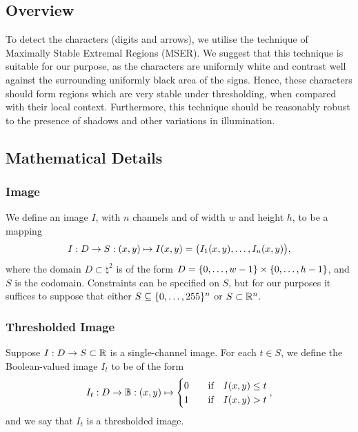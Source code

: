 \documentclass{article}
\begin{document}
\subsection{Overview}
\label{sec:implementation-overview}

To detect the characters (digits and arrows), we utilise the technique of
Maximally Stable Extremal Regions (MSER).
We suggest that this technique is suitable for our purpose, as the characters
are uniformly white and contrast well against the surrounding uniformly black
area of the signs.
Hence, these characters should form regions which are very stable under
thresholding, when compared with their local context.
Furthermore, this technique should be reasonably robust to the presence of
shadows and other variations in illumination.

\subsection{Mathematical Details}
\label{sec:mathematical-details}

\subsubsection*{Image}

We define an image $I$, with $n$ channels and of width $w$ and height $h$, to be
a mapping
\begin{equation}
  \label{eq:def-image}
  I
  :
  D \to S
  :
  \lr{x, y}
  \mapsto
  I\lr{x, y}
  =
  \lr[\big]
  {
    I_{1}\lr{x, y}
    ,
    \dotsc
    ,
    I_{n}\lr{x, y}
  }
  ,
\end{equation}
where the domain $D \subset \natural^{2}$ is of the form
$D = \lbrace0, \dotsc, w - 1\rbrace \times \lbrace0, \dotsc, h - 1\rbrace$, and $S$ is the
codomain.
Constraints can be specified on $S$, but for our purposes it suffices to suppose
that either $S \subseteq \lbrace0, \dotsc, 255\rbrace^{n}$ or $S \subset \mathbb{R}^{n}$.

\subsubsection*{Thresholded Image}

Suppose $I : D \to S \subset \mathbb{R}$ is a single-channel image.
For each $t \in S$, we define the Boolean-valued image $I_{t}$ to be of the
form
\begin{equation}
  \label{eq:def-image-threshold}
  I_{t}
  :
  D \to \mathbb{B}
  :
  \lr{x, y}
  \mapsto
  \begin{cases}
    0
    &\qq{if}
    I\lr{x, y} \leq t
    \\
    1
    &\qq{if}
    I\lr{x, y} > t
  \end{cases}
  ,
\end{equation}
and we say that $I_{t}$ is a thresholded image.
\end{document}
